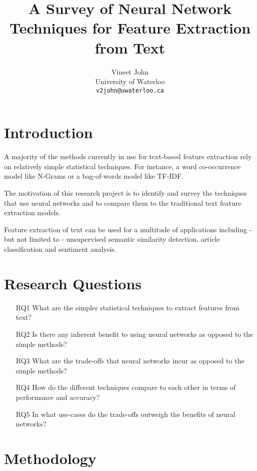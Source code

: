 \documentclass[11pt,a4paper]{article}
\title{A Survey of Neural Network Techniques for Feature Extraction from Text}
\author{
  Vineet John \\
  University of Waterloo \\
  {\tt v2john@uwaterloo.ca} \\
}
\date{}
\begin{document}
\maketitle

\section{Introduction} %
\label{sec:introduction}

  A majority of the methods currently in use for text-based feature extraction rely on relatively simple statistical techniques. For instance, a word co-occurrence model like N-Grams or a bag-of-words model like TF-IDF.

  The motivation of this research project is to identify and survey the techniques that use neural networks and to compare them to the traditional text feature extraction models.

  Feature extraction of text can be used for a multitude of applications including - but not limited to - unsupervised semantic similarity detection, article classification and sentiment analysis.


\section{Research Questions} %
\label{sec:research_questions}

  \begin{itemize}
    \item [RQ1] What are the simpler statistical techniques to extract features from text?
    \item [RQ2] Is there any inherent benefit to using neural networks as opposed to the simple methods?
    \item [RQ3] What are the trade-offs that neural networks incur as opposed to the simple methods?
    \item [RQ4] How do the different techniques compare to each other in terms of performance and accuracy?
    \item [RQ5] In what use-cases do the trade-offs outweigh the benefits of neural networks?
  \end{itemize}


\section{Methodology} %
\label{sec:methodology}
\end{document}
